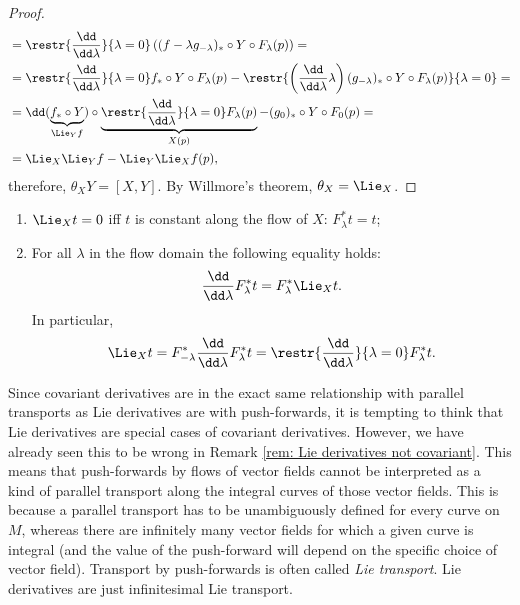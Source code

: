 \begin{proof}
\begin{align}
        &=\restr{\frac{\dd}{\dd \lambda}}{\lambda=0} \left((f-\lambda g_{-\lambda})_\ast\circ Y\circ F_\lambda(p)\right)=\\
        &=\restr{\frac{\dd}{\dd \lambda}}{\lambda=0} f_\ast\circ Y\circ F_\lambda (p)-\restr{\left(\frac{\dd}{\dd \lambda}\lambda\right)(g_{-\lambda})_\ast\circ Y\circ F_\lambda(p)}{\lambda=0}=\\
        &=\dd(\underbrace{f_\ast\circ Y}_{\Lie_Yf})\circ \underbrace{\restr{\frac{\dd}{\dd \lambda}}{\lambda=0} F_\lambda(p)}_{X(p)}-(g_0)_\ast \circ Y\circ F_0(p)=\\
        &=\Lie_X\Lie_Y f-\Lie_Y\Lie_X f(p),
    \end{align}
    therefore, $\theta_X Y=[X,Y]$. By Willmore's theorem, $\theta_X=\Lie_X$.
\end{proof}
\begin{cor}
\begin{enumerate}
    \item $\Lie_X t=0$ iff $t$ is constant along the flow of $X$: $F^\ast_\lambda t=t$;
    \item For all $\lambda$ in the flow domain the following equality holds:
    \[\frac{\dd}{\dd \lambda}F^\ast_\lambda t=F^\ast_\lambda \Lie_X t.\]
    In particular, 
    \[\Lie_X t=F^\ast_{-\lambda} \frac{\dd}{\dd \lambda}F^\ast_\lambda t=\restr{\frac{\dd}{\dd\lambda}}{\lambda=0}F^\ast_\lambda t.\]
\end{enumerate}
\end{cor}

\begin{rem}
    Since covariant derivatives are in the exact same relationship with parallel transports as Lie derivatives are with push-forwards, it is tempting to think that Lie derivatives are special cases of covariant derivatives. However, we have already seen this to be wrong in Remark \ref{rem: Lie derivatives not covariant}. This means that push-forwards by flows of vector fields cannot be interpreted as a kind of parallel transport along the integral curves of those vector fields. This is because a parallel transport has to be unambiguously defined for every curve on $M$, whereas there are infinitely many vector fields for which a given curve is integral (and the value of the push-forward will depend on the specific choice of vector field). Transport by push-forwards is often called \emph{Lie transport}. Lie derivatives are just infinitesimal Lie transport.
\end{rem}

